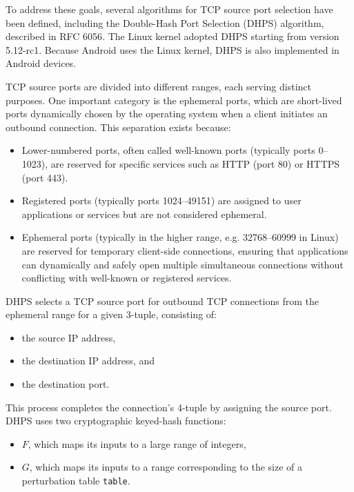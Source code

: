 \documentclass{report}
\begin{document}
To address these goals, several algorithms for TCP source port selection have been defined, including the \alert{Double-Hash Port Selection (DHPS)} algorithm, described in RFC 6056\cite{larsenRecommendationsTransportProtocolPort2011}. The Linux kernel adopted DHPS starting from version 5.12-rc1. Because \alert{Android} uses the Linux kernel, DHPS is also implemented in Android devices. %

TCP source ports are divided into different ranges, each serving distinct purposes. One important category is the \alert{ephemeral ports}, which are short-lived ports dynamically chosen by the operating system when a client initiates an outbound connection. This separation exists because:
\begin{itemize}
    \item Lower-numbered ports, often called \alert{well-known ports} (typically ports 0–1023), are reserved for specific services such as HTTP (port 80) or HTTPS (port 443).
    \item \alert{Registered ports} (typically ports 1024–49151) are assigned to user applications or services but are not considered ephemeral.
    \item \alert{Ephemeral ports} (typically in the higher range, e.g. 32768–60999 in Linux) are reserved for temporary client-side connections, ensuring that applications can dynamically and safely open multiple simultaneous connections without conflicting with well-known or registered services.
\end{itemize}

DHPS selects a TCP \alert{source port} for outbound TCP connections from the ephemeral range for a given \alert{3-tuple}, consisting of:
\begin{itemize}
    \item the \alert{source IP} address,
    \item the \alert{destination IP} address, and
    \item the \alert{destination port}.
\end{itemize}

This process completes the connection’s \alert{4-tuple} by assigning the source port. DHPS uses two \alert{cryptographic keyed-hash functions}:
\begin{itemize}
    \item \( F \), which maps its inputs to a large range of integers,
    \item \( G \), which maps its inputs to a range corresponding to the size of a \alert{perturbation table} \texttt{table}.
\end{itemize}
\end{document}
